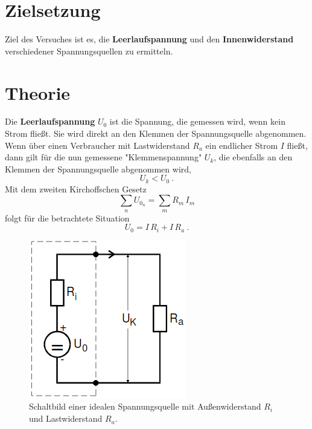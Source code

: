 \maketitle
\tableofcontents
\newpage

\section{Zielsetzung}
Ziel des Versuches ist es, die \textbf{Leerlaufspannung} und den \textbf{\textbf{Innenwiderstand}}
verschiedener Spannungsquellen zu ermitteln.
\section{Theorie}
Die \textbf{Leerlaufspannung} $U_0$ ist die Spannung, die gemessen wird, wenn kein Strom fließt.
Sie wird direkt an den Klemmen der Spannungsquelle abgenommen. Wenn über einen Verbraucher
mit Lastwiderstand $R_a$ ein endlicher Strom $I$ fließt, dann gilt für die nun gemessene
"Klemmenspannung" $U_k$, die ebenfalls an den Klemmen der Spannungsquelle abgenommen wird,
\begin{equation*}
    U_k < U_0 \ .
\end{equation*}
Mit dem zweiten Kirchoffschen Gesetz
\begin{equation}
  \sum_n U_{0_n} = \sum_m R_m \, I_m
  \label{eqn:4}
\end{equation}
folgt für die betrachtete Situation
\begin{equation}
    U_0 = I \, R_i + I \, R_a \ .
    \label{eqn:5}
\end{equation}
\begin{figure}[h]
  \centering
  \includegraphics[scale=0.7]{theorie.png}
  \caption{Schaltbild einer idealen Spannungsquelle mit Außenwiderstand $R_i$ und
  Lastwiderstand $R_a$.}
  \label{fig:1}
\end{figure}
